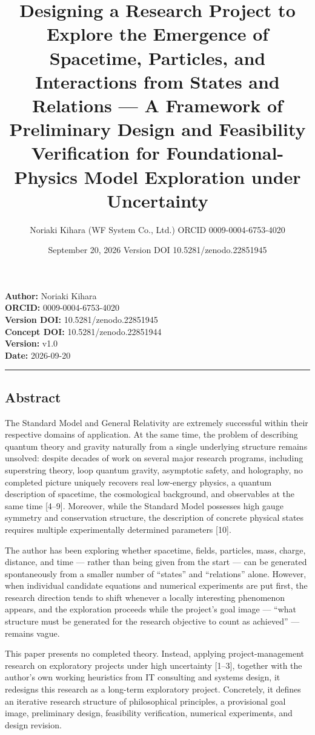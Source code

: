 \documentclass[
  a4paper,
]{article}
\title{Designing a Research Project to Explore the Emergence of
Spacetime, Particles, and Interactions from States and Relations --- A
Framework of Preliminary Design and Feasibility Verification for
Foundational-Physics Model Exploration under Uncertainty}
\author{Noriaki Kihara (WF System Co., Ltd.) ORCID 0009-0004-6753-4020}
\date{September 20, 2026 Version DOI 10.5281/zenodo.22851945}
\begin{document}
\maketitle

\textbf{Author:} Noriaki Kihara\\
\textbf{ORCID:} 0009-0004-6753-4020\\
\textbf{Version DOI:} 10.5281/zenodo.22851945\\
\textbf{Concept DOI:} 10.5281/zenodo.22851944\\
\textbf{Version:} v1.0\\
\textbf{Date:} 2026-09-20

\begin{center}\rule{0.5\linewidth}{0.5pt}\end{center}

\subsection{Abstract}\label{abstract}

The Standard Model and General Relativity are extremely successful
within their respective domains of application. At the same time, the
problem of describing quantum theory and gravity naturally from a single
underlying structure remains unsolved: despite decades of work on
several major research programs, including superstring theory, loop
quantum gravity, asymptotic safety, and holography, no completed picture
uniquely recovers real low-energy physics, a quantum description of
spacetime, the cosmological background, and observables at the same time
{[}4--9{]}. Moreover, while the Standard Model possesses high gauge
symmetry and conservation structure, the description of concrete
physical states requires multiple experimentally determined parameters
{[}10{]}.

The author has been exploring whether spacetime, fields, particles,
mass, charge, distance, and time --- rather than being given from the
start --- can be generated spontaneously from a smaller number of
``states'' and ``relations'' alone. However, when individual candidate
equations and numerical experiments are put first, the research
direction tends to shift whenever a locally interesting phenomenon
appears, and the exploration proceeds while the project's goal image ---
``what structure must be generated for the research objective to count
as achieved'' --- remains vague.

This paper presents no completed theory. Instead, applying
project-management research on exploratory projects under high
uncertainty {[}1--3{]}, together with the author's own working
heuristics from IT consulting and systems design, it redesigns this
research as a long-term exploratory project. Concretely, it defines an
iterative research structure of philosophical principles, a provisional
goal image, preliminary design, feasibility verification, numerical
experiments, and design revision.
\end{document}
